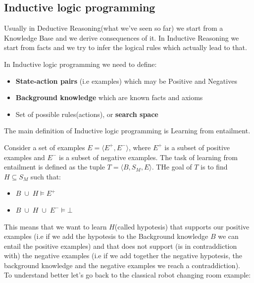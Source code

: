 \subsection{Inductive logic programming}
Usually in Deductive Reasoning(what we've seen so far) we start from a Knowledge Base and we derive consequences of it.
In Inductive Reasoning we start from facts and we try to infer the logical rules which actually lead to that.

In Inductive logic programming we need to define:
\begin{itemize}
    \item \textbf{State-action pairs} (i.e examples) which may be Positive and Negatives
    \item \textbf{Background knowledge} which are known facts and axioms
    \item Set of possible rules(actions), or \textbf{search space}
\end{itemize}

The main definition of Inductive logic programming is Learning from entailment.
\begin{tcolorbox}[colback=red!5!white,colframe=red!75!black,title=\textbf{Definition 4: Learning from entailment}]
Consider a set of examples $E=\langle E^+,E^- \rangle$, where $E^+$ is a subset of positive examples and $E^-$ is a subset of negative examples.
The task of learning from entailment is defined as the tuple $T=\langle B, S_M, E \rangle$. THe goal of $T$ is to find $H\subseteq S_M$ such that:
\begin{itemize}
    \item $B\;\cup\;H\models E^+$
    \item $B\;\cup\;H\;\cup\;E^-\models \bot$
\end{itemize}
\end{tcolorbox}
This means that we want to learn $H$(called hypotesis) that supports our positive
examples (i.e if we add the hypotesis to the Background knowledge $B$ we can entail
the positive examples) and that does not support (is in contraddiction with) the negative
examples (i.e if we add together the negative hypotesis, the background knowledge and the
negative examples we reach a contraddiction).\\

To understand better let's go back to the classical robot changing room example:\\


